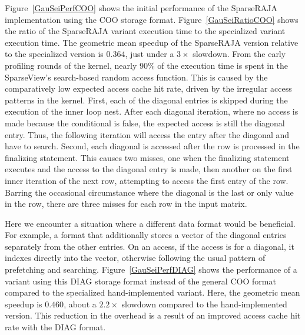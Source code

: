 Figure~\ref{GauSeiPerfCOO} shows the initial performance of the SparseRAJA implementation using the COO storage format.
Figure~\ref{GauSeiRatioCOO} shows the ratio of the SparseRAJA variant execution time to the specialized variant execution time.
The geometric mean speedup of the SparseRAJA version relative to the specialized version is $0.364$, just under a $3\times$ slowdown. 
From the early profiling rounds of the \GauSei{} kernel, nearly 90\% of the execution time is spent in the SparseView's search-based random access function.
This is caused by the comparatively low expected access cache hit rate, driven by the irregular access patterns in the kernel.
First, each of the diagonal entries is skipped during the execution of the inner loop nest.
After each diagonal iteration, where no access is made because the conditional is false, the expected access is still the diagonal entry. 
Thus, the following iteration will access the entry after the diagonal and have to search.
Second, each diagonal is accessed after the row is processed in the finalizing statement.
This causes two misses, one when the finalizing statement executes and the access to the diagonal entry is made, then another on the first inner iteration of the next row, attempting to access the first entry of the row.
Barring the occasional circumstance where the diagonal is the last or only value in the row, there are three misses for each row in the input matrix.

Here we encounter a situation where a different data format would be beneficial.
For example, a format that additionally stores a vector of the diagonal entries separately from the other entries.
On an access, if the access is for a diagonal, it indexes directly into the vector, otherwise following the usual pattern of prefetching and searching.
Figure~\ref{GauSeiPerfDIAG} shows the performance of a variant using this DIAG storage format instead of the general COO format compared to the specialized hand-implemented variant.
Here, the geometric mean speedup is $0.460$, about a $2.2\times$ slowdown compared to the hand-implemented version.
This reduction in the overhead is a result of an improved access cache hit rate with the DIAG format.

